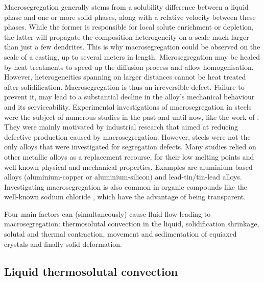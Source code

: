 Macrosegregation generally stems from a solubility difference between a liquid phase and one or more solid phases, along with
a relative velocity between these phases. While the former is responsible for local solute enrichment or depletion, the latter
will propagate the composition heterogeneity on a scale much larger than just a few dendrites.
This is why macrosegregation could be observed on the scale of a casting, up to several meters in length. 
Microsegregation may be healed by heat treatments to speed up the diffusion process and allow homogenisation. However, heterogeneities 
spanning on larger distances cannot be heat treated after solidification. Macrosegregation is thus an irreversible defect. 
Failure to prevent it, may lead to a substantial decline in the alloy's mechanical behaviour and its serviceability.
Experimental investigations of macrosegregation in steels were the subject of numerous studies in the past and until now, 
like the work of \citet{suzuki_mechanism_1973,shah_effect_1989,lesoult_macrosegregation_2005}. They were mainly motivated
by industrial research that aimed at reducing defective production caused by macrosegregation.
However, steels were not the only alloys that were investigated for segregation defects. 
Many studies relied on other metallic alloys as a replacement recourse, for their low
melting points and well-known physical and mechanical properties. Examples are aluminium-based alloys 
(aluminium-copper or aluminium-silicon) \citep{lesoult_equi-axed_2001,ferreira_macrosegregation_2004,ferreira_modeling_2009} 
and lead-tin/tin-lead alloys\citep{hebditch_observations_1974,prescott_convective_1994,hachani_experimental_2012}. Investigating macrosegregation 
is also common in organic compounds like the well-known 
sodium chloride \citep{wanqi_formation_1989,sarazin_studies_1992,ludwig_advanced_2012}, which have the advantage of being transparent.


Four main factors can (simultaneously) cause fluid flow leading to macrosegregation:
thermosolutal convection in the liquid, solidification shrinkage, solutal and thermal contraction,
movement and sedimentation of equiaxed crystals and finally solid deformation.

\subsection{Liquid thermosolutal convection}

